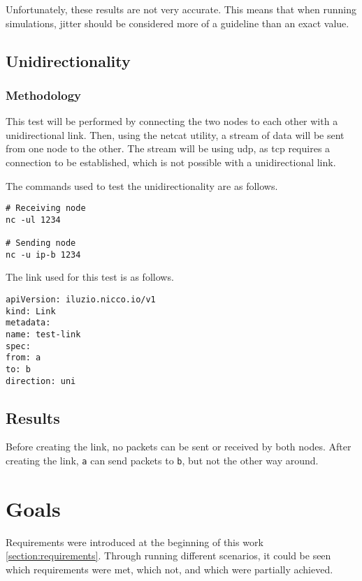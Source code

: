Unfortunately, these results are not very accurate.
This means that when running simulations, jitter should be considered more of a guideline than an exact value.


\subsection{Unidirectionality}

\subsubsection{Methodology}

This test will be performed by connecting the two nodes to each other with a unidirectional link. Then, using the netcat utility, a stream of data will be sent from one node to the other. The stream will be using \ac{udp}, as \ac{tcp} requires a connection to be established, which is not possible with a unidirectional link.

The commands used to test the unidirectionality are as follows.

\begin{verbatim}
# Receiving node
nc -ul 1234

# Sending node
nc -u ip-b 1234
\end{verbatim}

The link used for this test is as follows.

\begin{verbatim}
apiVersion: iluzio.nicco.io/v1
kind: Link
metadata:
name: test-link
spec:
from: a
to: b
direction: uni
\end{verbatim}

\subsection{Results}

Before creating the link, no packets can be sent or received by both nodes.
After creating the link, \verb|a| can send packets to \verb|b|, but not the other way around.

\section{Goals}

Requirements were introduced at the beginning of this work \ref{section:requirements}. Through running different scenarios, it could be seen which requirements were met, which not, and which were partially achieved.

